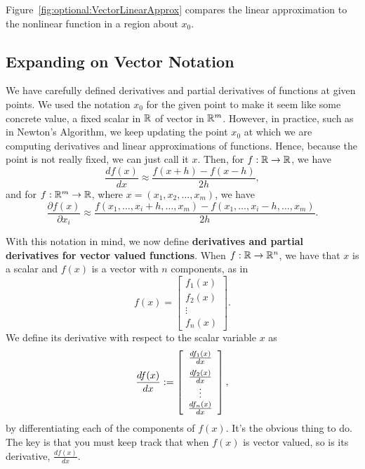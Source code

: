 Figure~\ref{fig:optional:VectorLinearApprox} compares the linear approximation to the nonlinear function in a region about $x_0$. 
\Qed

\subsection{Expanding on Vector Notation}
\label{sec:optional:optional:optional:CompactDerivativeNotation}

We have carefully defined derivatives and partial derivatives of functions at given points. We used the notation $x_0$ for the given point to make it seem like some concrete value, a fixed scalar in $\mathbb R$ of vector in $\mathbb R^m$. However, in practice, such as in Newton's Algorithm, we keep updating the point $x_0$ at which we are computing derivatives and linear approximations of functions. Hence, because the point is not really fixed, we can just call it $x$. Then, for $f:\mathbb R \to \mathbb R$, we have 
\begin{equation}
    \label{eq:optional:betterDerivativeNotation01}
    \frac{df(x)}{dx}\approx \frac{f(x+h) - f(x-h)}{2h},
\end{equation}
and for $f:\mathbb R^m \to \mathbb R$, where $x=(x_1, x_2, \ldots, x_m)$, we have
\begin{equation}
    \label{eq:optional:betterDerivativeNotation02}
    \frac{\partial f(x)}{\partial x_i}\approx \frac{f(x_1, \ldots, x_i+h, \ldots, x_m) - f(x_1, \ldots, x_i-h, \ldots, x_m)}{2h}.
\end{equation}

With this notation in mind, we now define \textbf{derivatives and partial derivatives for vector valued functions}. When $f:\mathbb R \to \mathbb R^n$, we have that $x$ is a scalar and $f(x)$ is a vector with $n$ components, as in 
\begin{equation}
    \label{eq:optional:VectorFunctions01}
    f(x) = \left[\begin{array}{c}
       f_1(x) \\
       f_2(x) \\
       \vdots\\
       f_n(x) 
    \end{array} \right].
\end{equation}
We define its derivative with respect to the scalar variable $x$ as
\begin{equation}
    \label{eq:optional:VectorFunctions02}
    \frac{df(x)}{dx} := \left[\begin{array}{c}
      \frac{df_1(x)}{dx} \medskip \\
       \frac{df_2(x)}{dx} \\
       \vdots\\
      \frac{df_n(x)}{dx}
    \end{array} \right],
\end{equation}
by differentiating each of the components of $f(x)$. It's the obvious thing to do. The key is that you must keep track that when $f(x)$ is vector valued, so is its derivative, $ \frac{df(x)}{dx}$. \\

